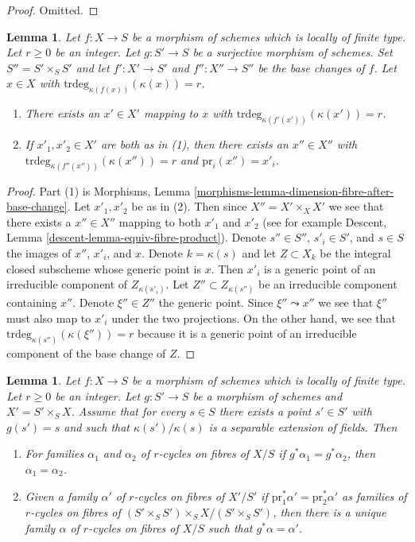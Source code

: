 \documentclass{stacks-project}
\theoremstyle{plain}
\newtheorem{lemma}[subsection]{Lemma}
\theoremstyle{definition}
\theoremstyle{remark}
\numberwithin{equation}{subsection}
\begin{document}
\begin{proof}
Omitted.
\end{proof}

\begin{lemma}
\label{lemma-coequalizer-dim-r}
Let $f : X \to S$ be a morphism of schemes which is locally of finite type.
Let $r \geq 0$ be an integer. Let $g : S' \to S$ be a surjective morphism of
schemes. Set $S'' = S' \times_S S'$ and let $f' : X' \to S'$
and $f'' : X'' \to S''$ be the base changes of $f$.
Let $x \in X$ with $\text{trdeg}_{\kappa(f(x))}(\kappa(x)) = r$.
\begin{enumerate}
\item There exists an $x' \in X'$ mapping to $x$
with $\text{trdeg}_{\kappa(f'(x'))}(\kappa(x')) = r$.
\item If $x'_1, x'_2 \in X'$ are both as in (1), then there
exists an $x'' \in X''$ with
$\text{trdeg}_{\kappa(f''(x''))}(\kappa(x'')) = r$ and
$\text{pr}_i(x'') = x'_i$.
\end{enumerate}
\end{lemma}

\begin{proof}
Part (1) is
Morphisms, Lemma \ref{morphisms-lemma-dimension-fibre-after-base-change}.
Let $x'_1, x'_2$ be as in (2). Then since $X'' = X' \times_X X'$
we see that there
exists a $x'' \in X''$ mapping to both $x'_1$ and $x'_2$ (see for
example Descent, Lemma \ref{descent-lemma-equiv-fibre-product}).
Denote $s'' \in S''$, $s'_i \in S'$, and $s \in S$ the images
of $x''$, $x'_i$, and $x$.
Denote $k = \kappa(s)$ and let $Z \subset X_k$ be the integral
closed subscheme whose generic point is $x$. Then $x'_i$
is a generic point of an irreducible component of $Z_{\kappa(s'_i)}$.
Let $Z'' \subset Z_{\kappa(s'')}$ be an irreducible component
containing $x''$. Denote $\xi'' \in Z''$ the generic point.
Since $\xi'' \leadsto x''$ we see that $\xi''$ must also
map to $x'_i$ under the two projections. On the other hand,
we see that $\text{trdeg}_{\kappa(s'')}(\kappa(\xi'')) = r$
because it is a generic
point of an irreducible component of the base change of $Z$.
\end{proof}

\begin{lemma}
\label{lemma-descend-family}
Let $f : X \to S$ be a morphism of schemes which is locally of finite type.
Let $r \geq 0$ be an integer. Let $g : S' \to S$ be a morphism of
schemes and $X' = S' \times_S X$. Assume that for every $s \in S$ there
exists a point $s' \in S'$ with $g(s') = s$ and such that
$\kappa(s')/\kappa(s)$ is a separable extension of fields. Then
\begin{enumerate}
\item For families $\alpha_1$ and $\alpha_2$ of $r$-cycles on fibres of $X/S$
if $g^*\alpha_1 = g^*\alpha_2$, then $\alpha_1 = \alpha_2$.
\item Given a family $\alpha'$ of $r$-cycles on fibres of $X'/S'$ if
$\text{pr}_1^*\alpha' = \text{pr}_2^*\alpha'$ as families of
$r$-cycles on fibres of $(S' \times_S S') \times_S X / (S' \times_S S')$,
then there is a unique family $\alpha$ of $r$-cycles on fibres of $X/S$
such that $g^*\alpha = \alpha'$.
\end{enumerate}
\end{lemma}
\end{document}
